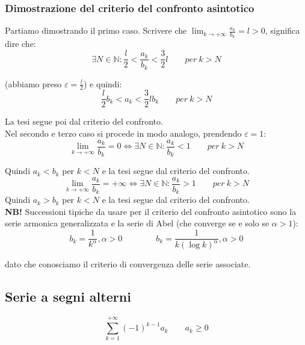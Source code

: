 \documentclass{article}
\begin{document}
\subsubsection{Dimostrazione del criterio del confronto asintotico}
Partiamo dimostrando il primo caso. Scrivere che $\lim_{k \to +\infty} \frac{a_k}{b_k} = l > 0$, significa dire che:
\begin{equation*}
    \exists N \in \mathbb{N} : \frac{l}{2} < \frac{a_k}{b_k} < \frac{3}{2}l \qquad per \ k > N
\end{equation*}

\noindent (abbiamo preso $\varepsilon = \frac{l}{2}$) e quindi:
\begin{equation*}
    \frac{l}{2} b_k < a_k < \frac{3}{2}lb_k \qquad per \ k > N
\end{equation*}

\noindent La tesi segue poi dal criterio del confronto.\\
Nel secondo e terzo caso si procede in modo analogo, prendendo $\varepsilon = 1$: 
\begin{equation*}
    \lim_{k \to +\infty} \frac{a_k}{b_k} = 0 \iff \exists N \in \mathbb{N} : \frac{a_k}{b_k} < 1 \qquad per \ k > N
\end{equation*}

\noindent Quindi $a_k < b_k$ per $k < N$ e la tesi segue dal criterio del confronto.
\begin{equation*}
    \lim_{k \to +\infty} \frac{a_k}{b_k} = +\infty \iff \exists N \in \mathbb{N} : \frac{a_k}{b_k} > 1 \qquad per \ k > N
\end{equation*}
\noindent Quindi $a_k > b_k$ per $k < N$ e la tesi segue dal criterio del confronto.\\

\noindent\textbf{NB!} Successioni tipiche da usare per il criterio del confronto asintotico sono la serie armonica generalizzata e la serie di Abel (che converge se e solo se $\alpha > 1$):
\begin{equation*}
    b_k = \frac{1}{k^\alpha}, \alpha > 0 \qquad \qquad b_k = \frac{1}{k(\log k)^\alpha}, \alpha > 0
\end{equation*}

\noindent dato che conosciamo il criterio di convergenza delle serie associate. 

\subsection{Serie a segni alterni}
\begin{equation*}
    \sum_{k = 1}^{+\infty} (-1)^{k - 1}a_k \qquad a_k \geq 0
\end{equation*}
\end{document}
